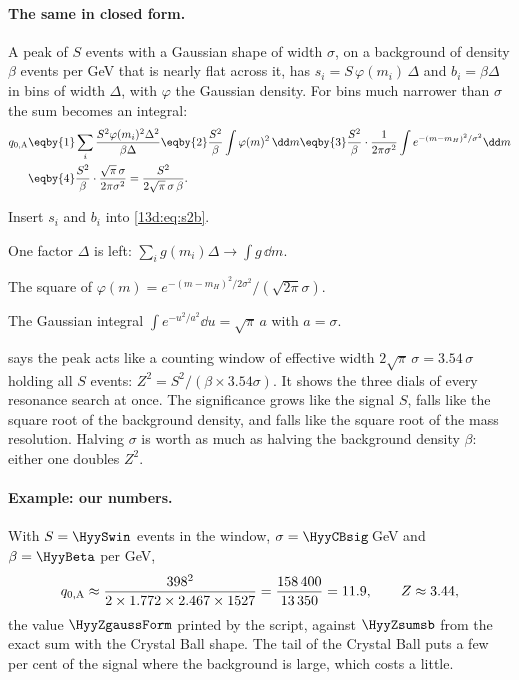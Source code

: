 \paragraph{The same in closed form.}
A peak of $S$ events with a Gaussian shape of width $\sigma$, on a background of density
$\beta$ events per GeV that is nearly flat across it, has $s_i=S\,\varphi(m_i)\,\Delta$ and
$b_i=\beta\Delta$ in bins of width $\Delta$, with $\varphi$ the Gaussian density. For
bins much narrower than $\sigma$ the sum becomes an integral:
\begin{align}
  q_{0,\rm A}
  &\eqby{1} \sum_i\frac{S^2\varphi(m_i)^2\Delta^2}{\beta\Delta}
   \eqby{2} \frac{S^2}{\beta}\int\varphi(m)^2\,\dd m
   \eqby{3} \frac{S^2}{\beta}\cdot\frac{1}{2\pi\sigma^2}\int e^{-(m-m_H)^2/\sigma^2}\dd m
  \nonumber\\
  &\eqby{4} \frac{S^2}{\beta}\cdot\frac{\sqrt\pi\,\sigma}{2\pi\sigma^2}
   = \frac{S^2}{2\sqrt\pi\,\sigma\,\beta} .
  \label{13d:eq:zgauss}
\end{align}
\begin{explain}
  \item Insert $s_i$ and $b_i$ into \eqref{13d:eq:s2b}.
  \item One factor $\Delta$ is left: $\sum_i g(m_i)\Delta\to\int g\,\dd m$.
  \item The square of $\varphi(m)=e^{-(m-m_H)^2/2\sigma^2}/(\sqrt{2\pi}\sigma)$.
  \item The Gaussian integral $\int e^{-u^2/a^2}\dd u=\sqrt\pi\,a$ with $a=\sigma$.
\end{explain}
 says the peak acts like a counting window of effective width
$2\sqrt\pi\,\sigma=3.54\,\sigma$ holding all $S$ events: $Z^2=S^2/(\beta\times3.54\sigma)$.
It shows the three dials of every resonance search at once. The significance grows like
the signal $S$, falls like the square root of the background density, and falls like the
square root of the mass resolution. Halving $\sigma$ is worth as much as halving the background density $\beta$:
either one doubles $Z^2$.

\paragraph{Example: our numbers.}
With $S=\HyySwin$ events in the window, $\sigma=\HyyCBsig\,$GeV and $\beta=\HyyBeta$ per
GeV,
\[
  q_{0,\rm A}\approx\frac{398^2}{2\times1.772\times2.467\times1527}
  =\frac{158\,400}{13\,350}=11.9,\qquad Z\approx3.44,
\]
the value $\HyyZgaussForm$ printed by the script, against $\HyyZsumsb$ from the exact sum
with the Crystal Ball shape. The tail of the Crystal Ball puts a few per cent of the
signal where the background is large, which costs a little.

